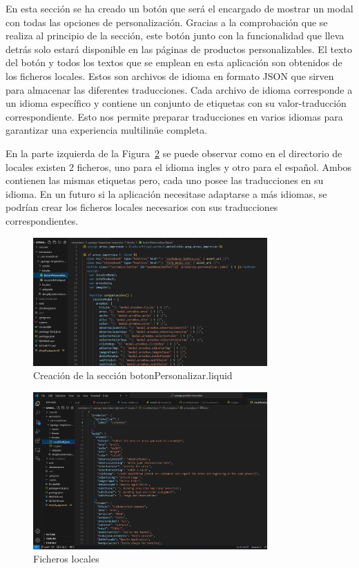 \documentclass[12pt]{article}
\begin{document}
En esta sección se ha creado un botón que será el encargado de mostrar un modal con todas las opciones de personalización. Gracias a la comprobación
que se realiza al principio de la sección, este botón junto con la funcionalidad que lleva detrás solo estará disponible en las páginas de productos personalizables.
El texto del botón y todos los textos que se emplean en esta aplicación son obtenidos de los ficheros locales. Estos son archivos de idioma en formato 
JSON que sirven para almacenar las diferentes traducciones. Cada archivo de idioma corresponde a un idioma específico y contiene un conjunto de etiquetas con su valor-traducción correspondiente. Esto nos 
permite preparar traducciones en varios idiomas para garantizar una experiencia multilinüe completa.

En la parte izquierda de la Figura~\ref{fig:locales} se puede observar como en el directorio de locales existen 2 ficheros, uno para el idioma ingles y otro para el español. 
Ambos contienen las mismas etiquetas pero, cada uno posee las traducciones en su idioma. En un futuro si la aplicación necesitase adaptarse a más idiomas, se podrían crear los ficheros locales
necesarios con sus traducciones correspondientes.


\begin{figure}[ht]
    \centering
    \includegraphics[width=0.8\textwidth]{imagenesUS1/seccionPersonalizarBoton.png}
    \caption{\label{fig:creacionSeccion}Creación de la sección botonPersonalizar.liquid}
    \vspace{\fill}
\end{figure}

\begin{figure}[ht]
    \centering
    \includegraphics[width=0.8\textwidth]{imagenesUS1/locales.png}
    \caption{\label{fig:locales}Ficheros locales}
    \vspace{\fill}
\end{figure}
\end{document}
